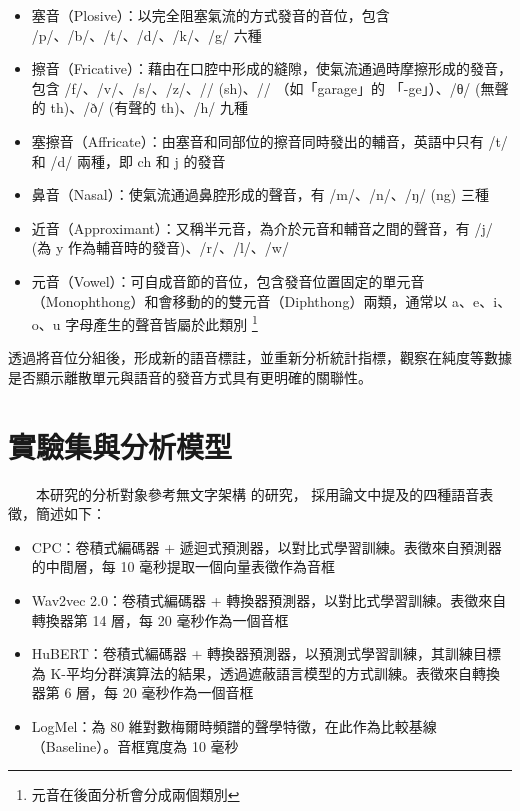 {        \begin{itemize}
            \item 塞音（Plosive）：以完全阻塞氣流的方式發音的音位，包含 /p/、/b/、/t/、/d/、/k/、/g/ 六種
            \item 擦音（Fricative）：藉由在口腔中形成的縫隙，使氣流通過時摩擦形成的發音，包含 /f/、/v/、/s/、/z/、/\textesh/ (sh)、/\textyogh/ （如「garage」的 「-ge」）、/θ/ (無聲的 th)、/ð/ (有聲的 th)、/h/ 九種
            \item 塞擦音（Affricate）：由塞音和同部位的擦音同時發出的輔音，英語中只有 /t\textesh/ 和 /d\textyogh/ 兩種，即 ch 和 j 的發音
            \item 鼻音（Nasal）：使氣流通過鼻腔形成的聲音，有 /m/、/n/、/ŋ/ (ng) 三種
            \item 近音（Approximant）：又稱半元音，為介於元音和輔音之間的聲音，有 /j/ (為 y 作為輔音時的發音)、/r/、/l/、/w/
            \item 元音（Vowel）：可自成音節的音位，包含發音位置固定的單元音（Monophthong）和會移動的的雙元音（Diphthong）兩類，通常以 a、e、i、o、u 字母產生的聲音皆屬於此類別 \footnote{元音在後面分析會分成兩個類別}  %
        \end{itemize}
        
        透過將音位分組後，形成新的語音標註，並重新分析統計指標，觀察在純度等數據是否顯示離散單元與語音的發音方式具有更明確的關聯性。


\section{實驗集與分析模型}

　　本研究的分析對象參考無文字架構 \cite{noauthor_textless_2021, lakhotia_generative_2021, lakhotia_generative_2021-1} 的研究，
採用論文中提及的四種語音表徵，簡述如下：

\begin{itemize}
    \item CPC：卷積式編碼器 + 遞迴式預測器，以對比式學習訓練。表徵來自預測器的中間層，每 10 毫秒提取一個向量表徵作為音框
    \item Wav2vec 2.0：卷積式編碼器 + 轉換器預測器，以對比式學習訓練。表徵來自轉換器第 14 層，每 20 毫秒作為一個音框
    \item HuBERT：卷積式編碼器 + 轉換器預測器，以預測式學習訓練，其訓練目標為 K-平均分群演算法的結果，透過遮蔽語言模型的方式訓練。表徵來自轉換器第 6 層，每 20 毫秒作為一個音框
    \item LogMel：為 80 維對數梅爾時頻譜的聲學特徵，在此作為比較基線（Baseline）。音框寬度為 10 毫秒
\end{itemize}

}
